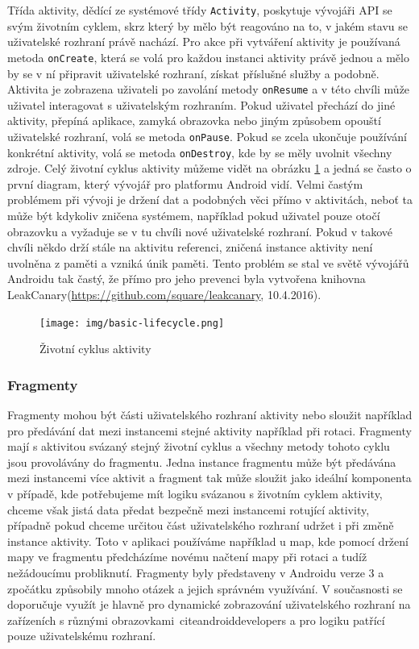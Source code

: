 \documentclass[czech,master,public,dept460,male,java,cpdeclaration]{diploma}
\begin{document}
 Třída aktivity, dědící ze systémové třídy \texttt{Activity},
 poskytuje vývojáři API se svým životním cyklem, skrz který by mělo být reagováno na to, v jakém
stavu se uživatelské rozhraní právě nachází. Pro akce při vytváření aktivity je používaná metoda
\texttt{onCreate}, která se volá pro každou instanci aktivity právě jednou a mělo by se v ní připravit
uživatelské rozhraní, získat příslušné služby a podobně. Aktivita je zobrazena uživateli po zavolání metody
\texttt{onResume} a v této chvíli může uživatel interagovat s uživatelským rozhraním. Pokud uživatel
přechází do jiné aktivity, přepíná aplikace, zamyká obrazovka nebo jiným způsobem opouští uživatelské
rozhraní, volá se metoda \texttt{onPause}. Pokud se zcela ukončuje používání konkrétní aktivity,
volá se metoda \texttt{onDestroy}, kde by se měly uvolnit všechny zdroje.
Celý životní cyklus aktivity můžeme vidět na obrázku \ref{fig:activitylyfecycle} a jedná se
často o první diagram, který vývojář pro platformu Android vidí.
Velmi častým problémem při vývoji je držení dat a podobných věci přímo v aktivitách,
neboť ta může být kdykoliv zničena systémem, například
pokud uživatel pouze otočí obrazovku a vyžaduje se v tu chvíli nové uživatelské rozhraní. Pokud v takové chvíli
někdo drží stále na aktivitu referenci, zničená instance aktivity není uvolněna z paměti a vzniká únik paměti.
Tento problém se stal ve světě vývojářů Androidu tak častý, že přímo pro jeho prevenci byla vytvořena knihovna
LeakCanary(\url{https://github.com/square/leakcanary}, 10.4.2016).
\begin{figure}[H]
        \centering
                \texttt{[image: img/basic-lifecycle.png]}
        \caption{Životní cyklus aktivity}
        \label{fig:activitylyfecycle}
\end{figure}

\subsubsection{Fragmenty}
Fragmenty mohou být části uživatelského rozhraní aktivity nebo sloužit například pro předávání
dat mezi instancemi stejné aktivity například při rotaci. Fragmenty mají s aktivitou svázaný stejný životní cyklus
a všechny metody tohoto cyklu jsou provolávány do fragmentu. Jedna instance fragmentu
může být předávána mezi instancemi více aktivit a fragment tak může sloužit jako ideální komponenta
v případě, kde potřebujeme mít logiku svázanou s životním cyklem aktivity, chceme však jistá data
předat bezpečně mezi instancemi rotující aktivity, případně pokud chceme určitou část uživatelského
rozhraní udržet i při změně instance aktivity. Toto v aplikaci používáme například u map, kde pomocí
držení mapy ve fragmentu předcházíme novému načtení mapy při rotaci a tudíž nežádoucímu probliknutí.
Fragmenty byly představeny v Androidu verze 3 a zpočátku způsobily mnoho otázek a jejich správném využívání.
V současnosti se doporučuje využít je hlavně pro dynamické zobrazování uživatelského rozhraní na
zařízeních s různými obrazovkami\ cite{androiddevelopers} a pro logiku patřící pouze uživatelskému rozhraní.
\end{document}
